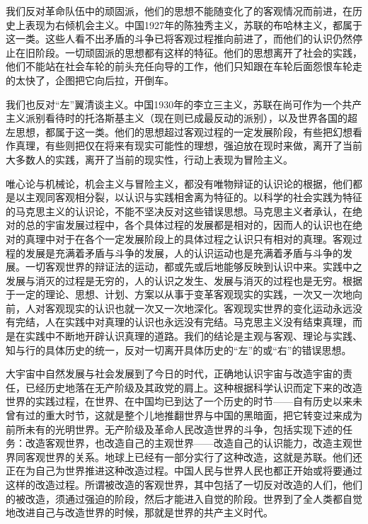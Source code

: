 \documentclass[UTF8, 12pt, a4paper]{ctexrep}
\begin{document}
我们反对革命队伍中的顽固派，他们的思想不能随变化了的客观情况而前进，在历史上表现为右倾机会主义。中国1927年的陈独秀主义，苏联的布哈林主义，都属于这一类。这些人看不出矛盾的斗争已将客观过程推向前进了，而他们的认识仍然停止在旧阶段。一切顽固派的思想都有这样的特征。他们的思想离开了社会的实践，他们不能站在社会车轮的前头充任向导的工作，他们只知跟在车轮后面怨恨车轮走的太快了，企图把它向后拉，开倒车。

我们也反对“左”翼清谈主义。中国1930年的李立三主义，苏联在尚可作为一个共产主义派别看待时的托洛斯基主义（现在则已成最反动的派别），以及世界各国的超左思想，都属于这一类。他们的思想超过客观过程的一定发展阶段，有些把幻想看作真理，有些则把仅在将来有现实可能性的理想，强迫放在现时来做，离开了当前大多数人的实践，离开了当前的现实性，行动上表现为冒险主义。

唯心论与机械论，机会主义与冒险主义，都没有唯物辩证的认识论的根据，他们都是以主观同客观相分裂，以认识与实践相舍离为特征的。以科学的社会实践为特征的马克思主义的认识论，不能不坚决反对这些错误思想。马克思主义者承认，在绝对的总的宇宙发展过程中，各个具体过程的发展都是相对的，因而人的认识也在绝对的真理中对于在各个一定发展阶段上的具体过程之认识只有相对的真理。客观过程的发展是充满着矛盾与斗争的发展，人的认识运动也是充满着矛盾与斗争的发展。一切客观世界的辩证法的运动，都或先或后地能够反映到认识中来。实践中之发展与消灭的过程是无穷的，人的认识之发生、发展与消灭的过程也是无穷。根据于一定的理论、思想、计划、方案以从事于变革客观现实的实践，一次又一次地向前，人对客观现实的认识也就一次又一次地深化。客观现实世界的变化运动永远没有完结，人在实践中对真理的认识也永远没有完结。马克思主义没有结束真理，而是在实践中不断地开辟认识真理的道路。我们的结论是主观与客观、理论与实践、知与行的具体历史的统一，反对一切离开具体历史的“左”的或“右”的错误思想。

大宇宙中自然发展与社会发展到了今日的时代，正确地认识宇宙与改造宇宙的责任，已经历史地落在无产阶级及其政党的肩上。这种根据科学认识而定下来的改造世界的实践过程，在世界、在中国均已到达了一个历史的时节——自有历史以来未曾有过的重大时节，这就是整个儿地推翻世界与中国的黑暗面，把它转变过来成为前所未有的光明世界。无产阶级及革命人民改造世界的斗争，包括实现下述的任务：改造客观世界，也改造自己的主观世界——改造自己的认识能力，改造主观世界同客观世界的关系。地球上已经有一部分实行了这种改造，这就是苏联。他们还正在为自己为世界推进这种改造过程。中国人民与世界人民也都正开始或将要通过这样的改造过程。所谓被改造的客观世界，其中包括了一切反对改造的人们，他们的被改造，须通过强迫的阶段，然后才能进入自觉的阶段。世界到了全人类都自觉地改进自己与改造世界的时候，那就是世界的共产主义时代。
\end{document}
